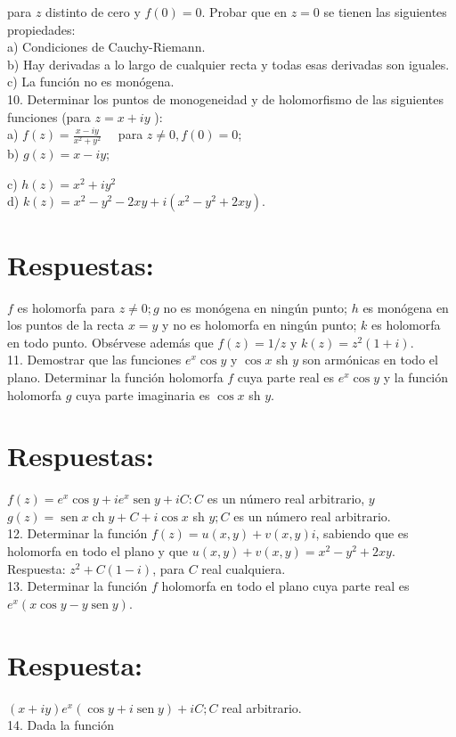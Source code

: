 \documentclass[10pt]{article}
\theoremstyle{plain}
\theoremstyle{definition}
\theoremstyle{remark}
\begin{document}
para $z$ distinto de cero y $f(0)=0$. Probar que en $z=0$ se tienen las siguientes propiedades:\\
a) Condiciones de Cauchy-Riemann.\\
b) Hay derivadas a lo largo de cualquier recta y todas esas derivadas son iguales.\\
c) La función no es monógena.\\
10. Determinar los puntos de monogeneidad y de holomorfismo de las siguientes funciones (para $z=x+i y$ ):\\
a) $f(z)=\frac{x-i y}{x^{2}+y^{2}} \quad$ para $z \neq 0, f(0)=0$;\\
b) $g(z)=x-i y$;


c) $h(z)=x^{2}+i y^{2}$\\
d) $k(z)=x^{2}-y^{2}-2 x y+i\left(x^{2}-y^{2}+2 x y\right)$.

\section*{Respuestas:}
$f$ es holomorfa para $z \neq 0 ; g$ no es monógena en ningún punto; $h$ es monógena en los puntos de la recta $x=y$ y no es holomorfa en ningún punto; $k$ es holomorfa en todo punto. Obsérvese además que $f(z)=1 / z$ y $k(z)=z^{2}(1+i)$.\\
11. Demostrar que las funciones $e^{x} \cos y$ y $\cos x$ sh $y$ son armónicas en todo el plano. Determinar la función holomorfa $f$ cuya parte real es $e^{x} \cos y$ y la función holomorfa $g$ cuya parte imaginaria es $\cos x$ sh $y$.

\section*{Respuestas:}
$f(z)=e^{x} \cos y+i e^{x} \operatorname{sen} y+i C: C$ es un número real arbitrario, $y$\\
$g(z)=\operatorname{sen} x \operatorname{ch} y+C+i \cos x$ sh $y ; C$ es un número real arbitrario.\\
12. Determinar la función $f(z)=u(x, y)+v(x, y) i$, sabiendo que es holomorfa en todo el plano y que $u(x, y)+v(x, y)=x^{2}-y^{2}+2 x y$.\\
Respuesta: $z^{2}+C(1-i)$, para $C$ real cualquiera.\\
13. Determinar la función $f$ holomorfa en todo el plano cuya parte real es $e^{x}(x \cos y-y \operatorname{sen} y)$.

\section*{Respuesta:}
$(x+i y) e^{x}(\cos y+i \operatorname{sen} y)+i C ; C$ real arbitrario.\\
14. Dada la función
\end{document}
